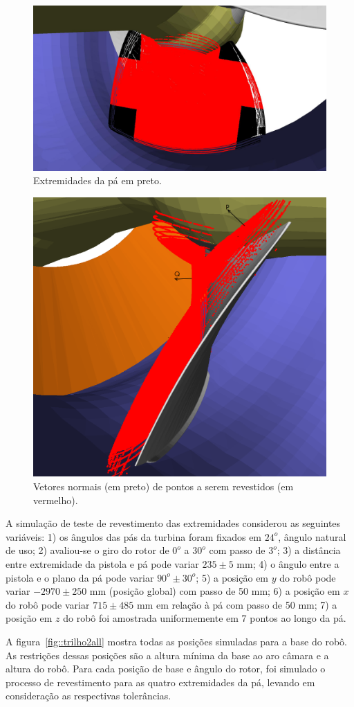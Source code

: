 \begin{figure}[!ht]
	\centering	
	\includegraphics[width=.8\columnwidth]{method/figs/tocoat.jpg}
	\caption{Extremidades da pá em preto.}
	\label{fig::extremidades}
\end{figure}

\begin{figure}[!ht]
	\centering	
	\includegraphics[width=.5\columnwidth]{method/figs/normal.png}
	\caption{Vetores normais (em preto) de pontos a serem revestidos (em
	vermelho).}
	\label{fig::normal}
\end{figure}

A simulação de teste de revestimento das extremidades considerou as seguintes
variáveis: 1) os ângulos das pás da turbina foram fixados em $24^o$, ângulo
natural de uso; 2) avaliou-se o giro do rotor de $0^o$ a $30^o$ com passo de
$3^o$; 3) a distância entre extremidade da pistola e pá pode variar $235 \pm 5$
mm; 4) o ângulo entre a pistola e o plano da pá pode variar $90^o \pm 30^o$; 5)
a posição em $y$ do robô pode variar $-2970 \pm 250$ mm (posição global) com
passo de 50 mm; 6) a posição em $x$ do robô pode variar $715 \pm 485$ mm em
relação à pá com passo de 50 mm; 7) a posição em $z$ do robô foi amostrada
uniformemente em 7 pontos ao longo da pá.

A figura~\ref{fig::trilho2all} mostra todas as posições simuladas para a base do
robô. As restrições dessas posições são a altura mínima da base ao aro câmara e
a altura do robô. Para cada posição de base e ângulo do rotor, foi simulado o
processo de revestimento para as quatro extremidades da pá, levando em
consideração as respectivas tolerâncias.

